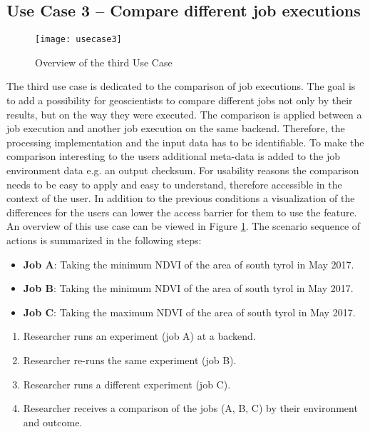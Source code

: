 \documentclass[draft,final]{vutinfth} %
\begin{document}
\subsection{Use Case 3 – Compare different job executions}\label{UseCase3}
\begin{figure}[h]
	\centering
	\texttt{[image: usecase3]}
	\caption{Overview of the third Use Case}
	\label{fig:usecase3} %
\end{figure}
The third use case is dedicated to the comparison of job executions. The goal is to add a possibility for geoscientists to compare different jobs not only by their results, but on the way they were executed. The comparison is applied between a job execution and another job execution on the same backend. Therefore, the processing implementation and the input data has to be identifiable. To make the comparison interesting to the users additional meta-data is added to the job environment data e.g. an output checksum. For usability reasons the comparison needs to be easy to apply and easy to understand, therefore accessible in the context of the user. In addition to the previous conditions a visualization of the differences for the users can lower the access barrier for them to use the feature. An overview of this use case can be viewed in Figure \ref{fig:usecase3}.
The scenario sequence of actions is summarized in the following steps: \\

\begin{itemize}
	\item \textbf{Job A}: Taking the minimum NDVI of the area of south tyrol in May 2017. 
	\item \textbf{Job B}: Taking the minimum NDVI of the area of south tyrol in May 2017.
	\item \textbf{Job C}: Taking the maximum NDVI of the area of south tyrol in May 2017.
\end{itemize}

\begin{enumerate}
	\item Researcher runs an experiment (job A) at a backend.
	\item Researcher re-runs the same experiment (job B).
	\item Researcher runs a different experiment (job C).   
	\item Researcher receives a comparison of the jobs (A, B, C) by their environment and outcome.
\end{enumerate}
\end{document}
